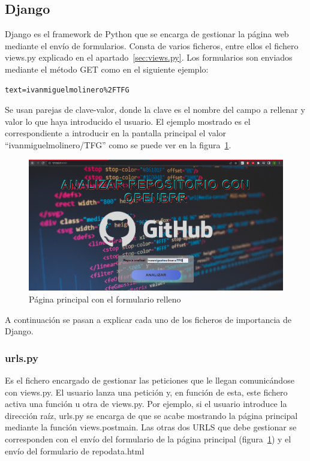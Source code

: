 \documentclass[a4paper, 12pt]{book}
\begin{document}
\subsection{Django}
Django es el framework de Python que se encarga de gestionar la página web mediante el envío de formularios. Consta de varios ficheros, entre ellos el fichero views.py explicado en el apartado~\ref{sec:views.py}.
Los formularios son enviados mediante el método GET como en el siguiente ejemplo:
\begin{verbatim}
text=ivanmiguelmolinero%2FTFG
\end{verbatim}
Se usan parejas de clave-valor, donde la clave es el nombre del campo a rellenar y valor lo que haya introducido el usuario. El ejemplo mostrado es el correspondiente a introducir en la pantalla principal el valor ``ivanmiguelmolinero/TFG'' como se puede ver en la figura~\ref{fig:ivanmiguelmolinero/TFG}.
\begin{figure}
    
    \includegraphics[bb=0 0 800 600, width=12cm, keepaspectratio]{img/maintfg.png}
    \caption{Página principal con el formulario relleno}\label{fig:ivanmiguelmolinero/TFG}
\end{figure}
A continuación se pasan a explicar cada uno de los ficheros de importancia de Django.
\subsubsection{urls.py}
Es el fichero encargado de gestionar las peticiones que le llegan comunicándose con views.py. El usuario lanza una petición y, en función de esta, este fichero activa una función u otra de views.py. Por ejemplo, si el usuario introduce la dirección raíz, urls.py se encarga de que se acabe mostrando la página principal mediante la función views.post\textunderscore main. Las otras dos URLS que debe gestionar se corresponden con el envío del formulario de la página principal (figura~\ref{fig:ivanmiguelmolinero/TFG}) y el envío del formulario de repo\textunderscore data.html
\end{document}
